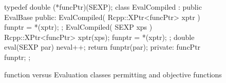 \documentclass[nojss,shortnames,article]{jss}
\begin{document}
\begin{sidewaysfigure}
\begin{minipage}{0.56\linewidth}
\begin{CodeChunk}
\begin{CodeInput}
{{	typedef double (*funcPtr)(SEXP);
	class EvalCompiled : public EvalBase {
	public:
	    EvalCompiled( Rcpp::XPtr<funcPtr> xptr ) {
		funptr = *(xptr);
	    };
	    EvalCompiled( SEXP xps ) {
		Rcpp::XPtr<funcPtr> xptr(xps);
		funptr = *(xptr);
	    };
	    double eval(SEXP par) {
		neval++;
		return funptr(par);
	    }
	private:
	    funcPtr funptr;
	};

    }
}
      \end{CodeInput}
    \end{CodeChunk}
    
    \normalsize {}
  \end{minipage}
  \caption{ function versus Evaluation classes permitting
     and  objective functions}
  \label{fig:deoptim_end}
\end{sidewaysfigure}
\end{document}
